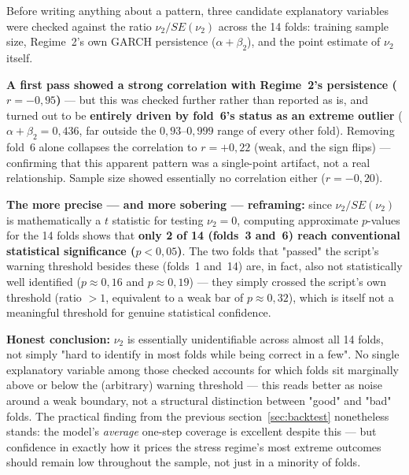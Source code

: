 \documentclass[12pt,a4paper]{article}
\begin{document}
	\begin{corrbox}
		Before writing anything about a pattern, three candidate
		explanatory variables were checked against the ratio
		$\nu_2/SE(\nu_2)$ across the 14 folds: training sample
		size, Regime~2's own GARCH persistence
		($\alpha+\beta_2$), and the point estimate of $\nu_2$
		itself.
		
		\textbf{A first pass showed a strong correlation with
			Regime~2's persistence ($r=-0{,}95$)} --- but this was
		checked further rather than reported as is, and turned out to be
		\textbf{entirely driven by fold~6's status as an extreme
			outlier} ($\alpha+\beta_2 = 0{,}436$, far outside the
		$0{,}93$--$0{,}999$ range of every other fold).
		Removing fold~6 alone collapses the correlation to $r=+0{,}22$
		(weak, and the sign flips) --- confirming that this apparent
		pattern was a single-point artifact, not a real relationship. Sample
		size showed essentially no correlation either
		($r=-0{,}20$).
		
		\textbf{The more precise --- and more sobering ---
			reframing:} since $\nu_2/SE(\nu_2)$ is mathematically a $t$
		statistic for testing $\nu_2=0$, computing approximate
		$p$-values for the 14 folds shows that \textbf{only 2 of 14 (folds~3
			and~6) reach conventional statistical significance
			($p<0{,}05$)}. The two folds that "passed" the
		script's warning threshold besides these (folds~1 and~14)
		are, in fact, also not statistically well identified
		($p \approx 0{,}16$ and $p \approx 0{,}19$) --- they simply
		crossed the script's own threshold (ratio $>1$, equivalent to a
		weak bar of $p \approx 0{,}32$), which is itself not a
		meaningful threshold for genuine statistical confidence.
		
		\textbf{Honest conclusion:} $\nu_2$ is essentially
		unidentifiable across almost all 14 folds, not
		simply "hard to identify in most folds while being
		correct in a few". No single explanatory variable
		among those checked accounts for which folds sit marginally
		above or below the (arbitrary) warning threshold --- this
		reads better as noise around a weak boundary, not a
		structural distinction between "good" and "bad"
		folds. The practical finding from the previous
		section~\ref{sec:backtest} nonetheless stands:
		the model's \emph{average} one-step coverage is excellent despite
		this --- but confidence in exactly how it prices the
		stress regime's most extreme outcomes should remain low
		throughout the sample, not just in a minority of
		folds.
	\end{corrbox}
	
\end{document}

